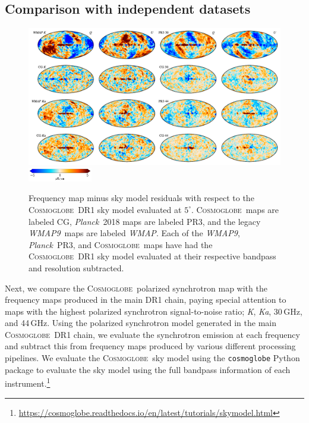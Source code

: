 \documentclass[twocolumn]{../../common/aa}
\def\WMAP{\emph{WMAP}}
\def\WMAPnine{\emph{WMAP9}}
\def\Planck{\emph{Planck}}
\newcommand{\cosmoglobe}{\textsc{Cosmoglobe}}
\newcommand{\K}[0]{\textit K}
\newcommand{\Ka}[0]{\textit{Ka}}
\begin{document}
\subsection{Comparison with independent datasets}
\label{sec:comp_independent}

\begin{figure}
	\begin{center}
	\includegraphics[width=\textwidth]{figures/CG_DR1_residuals.pdf}
        \includegraphics[width=0.25\textwidth]{figures/cbar_5uK.pdf}
	\end{center}
	\caption{Frequency map minus sky model residuals with respect to the \cosmoglobe\ DR1 sky model evaluated at $5^\circ$. \cosmoglobe\ maps are labeled CG, \Planck\ 2018 maps are labeled PR3, and the legacy \WMAPnine\ maps are labeled \WMAP. Each of the \WMAPnine, \Planck\ PR3, and \cosmoglobe\ maps have had the \cosmoglobe\ DR1 sky model evaluated at their respective bandpass and resolution subtracted. 
	}
	\label{fig:cg_residuals}
\end{figure}

Next, we compare the \cosmoglobe\ polarized synchrotron map with the frequency maps produced in the main DR1 chain, paying special attention to maps with the highest polarized synchrotron signal-to-noise ratio; \K, \Ka, 30\,GHz, and 44\,GHz.
Using the polarized synchrotron model generated in the main \cosmoglobe\ DR1 chain, we evaluate the synchrotron emission at each frequency and subtract this from frequency maps produced by various different processing pipelines. We evaluate the \cosmoglobe\ sky model using the \texttt{cosmoglobe} Python package to evaluate the sky model using the full bandpass information of each instrument.\footnote{\url{https://cosmoglobe.readthedocs.io/en/latest/tutorials/skymodel.html}} %
\end{document}
